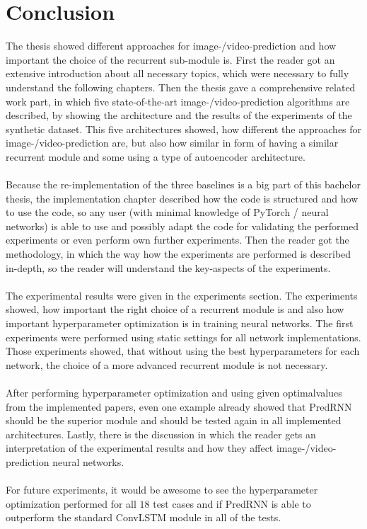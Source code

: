 \section{Conclusion} \label{section::conclusion}
 The thesis showed different approaches for image-/video-prediction and how important the choice of the recurrent sub-module is.
 First the reader got an extensive introduction
 about all necessary topics, which were necessary to fully understand the following chapters. Then the thesis gave a comprehensive related work part, in which
 five state-of-the-art image-/video-prediction algorithms are described, by showing the architecture and the results of the experiments of the synthetic dataset.
 This five architectures showed, how different the approaches for image-/video-prediction are, but also how similar in form of
 having a similar recurrent module and some using a type of autoencoder architecture.
 \\\\
 Because the re-implementation
 of the three baselines is a big part of this bachelor thesis, the implementation chapter described how the code is structured and how to use the code, so any
 user (with minimal knowledge of PyTorch / neural networks) is able to use and possibly adapt the code for validating the performed experiments or even perform
 own further experiments. Then the reader got the methodology, in which the way how the experiments are performed is described in-depth, so the reader will 
 understand the key-aspects of the experiments.
 \\\\
 The experimental results were given in the experiments section.
 The experiments showed, how important the right choice of a recurrent module is and also how important hyperparameter optimization is in training neural networks.
 The first experiments were performed using static settings for all network implementations. Those experiments showed, that without using the \glqq best\grqq 
 hyperparameters for each network, the choice of a more advanced recurrent module is not necessary.
 \\\\ 
 After performing hyperparameter optimization and using given \glqq optimal\grqq values 
 from the implemented papers, even one example already showed that
 PredRNN should be the superior module and should be tested again in all implemented architectures. 
 Lastly, there is the discussion in which
 the reader gets an interpretation of the experimental results and how they affect image-/video-prediction neural networks.
 \\\\
 For future experiments, it would be awesome to see the hyperparameter optimization performed for all $18$ test cases and if PredRNN is able to outperform
 the standard ConvLSTM module in all of the tests.